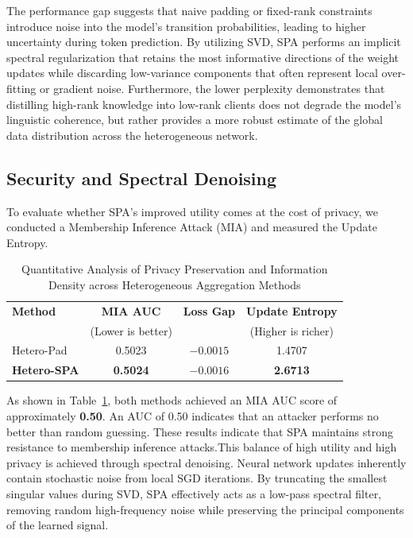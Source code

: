 \documentclass[conference]{IEEEtran}
\begin{document}
The performance gap suggests that naive padding or fixed-rank constraints introduce noise into the model's transition probabilities, leading to higher uncertainty during token prediction. By utilizing SVD, SPA performs an implicit spectral regularization that retains the most informative directions of the weight updates while discarding low-variance components that often represent local over-fitting or gradient noise. Furthermore, the lower perplexity demonstrates that distilling high-rank knowledge into low-rank clients does not degrade the model's linguistic coherence, but rather provides a more robust estimate of the global data distribution across the heterogeneous network.

\subsection{Security and Spectral Denoising}
\label{sec:security}

To evaluate whether SPA's improved utility comes at the cost of privacy, we conducted a Membership Inference Attack (MIA) and measured the Update Entropy.

\begin{table}[h]
    \centering
    \caption{Quantitative Analysis of Privacy Preservation and Information Density across Heterogeneous Aggregation Methods}
    \label{tab:security_results}
    \begin{tabular}{lccc}
    \toprule
    \textbf{Method} & \textbf{MIA AUC} & \textbf{Loss Gap} & \textbf{Update Entropy} \\
     & (Lower is better) & & (Higher is richer) \\
    \midrule
    Hetero-Pad & 0.5023 & $-0.0015$ & 1.4707 \\
    \textbf{Hetero-SPA} & \textbf{0.5024} & \textbf{$-0.0016$} & \textbf{2.6713} \\
    \bottomrule
    \end{tabular}
    \end{table}

As shown in Table~\ref{tab:security_results}, both methods achieved an MIA AUC score of approximately \textbf{0.50}. An AUC of 0.50 indicates that an attacker performs no better than random guessing. These results indicate that SPA maintains strong resistance to membership inference attacks.This balance of high utility and high privacy is achieved through spectral denoising. Neural network updates inherently contain stochastic noise from local SGD iterations. By truncating the smallest singular values during SVD, SPA effectively acts as a low-pass spectral filter, removing random high-frequency noise while preserving the principal components of the learned signal. 
\end{document}
